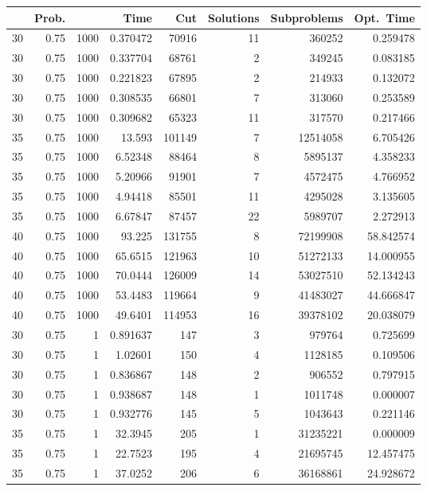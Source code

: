 \documentclass[a4paper,11pt]{article}
\begin{document}
\begin{table}
\begin{center}
\begin{tabular}{|rrr|r|r|rr|r|}
\hline
 & Prob. &  & Time & Cut & Solutions & Subproblems & Opt.\ Time \\
\hline
30 & 0.75 & 1000 & 0.370472 & 70916 & 11 & 360252 & 0.259478 \\
30 & 0.75 & 1000 & 0.337704 & 68761 & 2 & 349245 & 0.083185 \\
30 & 0.75 & 1000 & 0.221823 & 67895 & 2 & 214933 & 0.132072 \\
30 & 0.75 & 1000 & 0.308535 & 66801 & 7 & 313060 & 0.253589 \\
30 & 0.75 & 1000 & 0.309682 & 65323 & 11 & 317570 & 0.217466 \\
35 & 0.75 & 1000 & 13.593 & 101149 & 7 & 12514058 & 6.705426 \\
35 & 0.75 & 1000 & 6.52348 & 88464 & 8 & 5895137 & 4.358233 \\
35 & 0.75 & 1000 & 5.20966 & 91901 & 7 & 4572475 & 4.766952 \\
35 & 0.75 & 1000 & 4.94418 & 85501 & 11 & 4295028 & 3.135605 \\
35 & 0.75 & 1000 & 6.67847 & 87457 & 22 & 5989707 & 2.272913 \\
40 & 0.75 & 1000 & 93.225 & 131755 & 8 & 72199908 & 58.842574 \\
40 & 0.75 & 1000 & 65.6515 & 121963 & 10 & 51272133 & 14.000955 \\
40 & 0.75 & 1000 & 70.0444 & 126009 & 14 & 53027510 & 52.134243 \\
40 & 0.75 & 1000 & 53.4483 & 119664 & 9 & 41483027 & 44.666847 \\
40 & 0.75 & 1000 & 49.6401 & 114953 & 16 & 39378102 & 20.038079 \\
\hline
30 & 0.75 & 1 & 0.891637 & 147 & 3 & 979764 & 0.725699 \\
30 & 0.75 & 1 & 1.02601 & 150 & 4 & 1128185 & 0.109506 \\
30 & 0.75 & 1 & 0.836867 & 148 & 2 & 906552 & 0.797915 \\
30 & 0.75 & 1 & 0.938687 & 148 & 1 & 1011748 & 0.000007 \\
30 & 0.75 & 1 & 0.932776 & 145 & 5 & 1043643 & 0.221146 \\
35 & 0.75 & 1 & 32.3945 & 205 & 1 & 31235221 & 0.000009 \\
35 & 0.75 & 1 & 22.7523 & 195 & 4 & 21695745 & 12.457475 \\
35 & 0.75 & 1 & 37.0252 & 206 & 6 & 36168861 & 24.928672 \\

\end{tabular}
\end{center}
\end{table}
\end{document}
